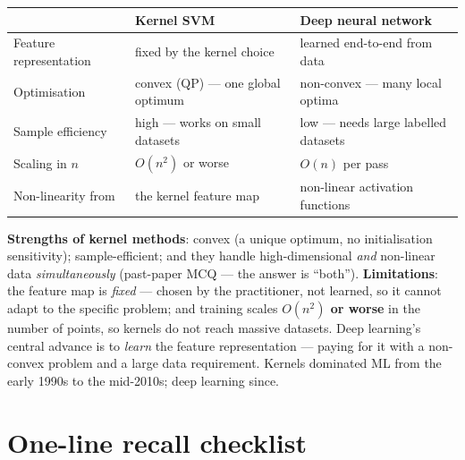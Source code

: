 \documentclass[11pt, a4paper]{article}
\newcommand{\thead}[1]{\textbf{#1}}
\newcommand{\kw}[1]{\textbf{#1}}
\begin{document}
\begin{center}
\renewcommand{\arraystretch}{1.2}
\begin{tabularx}{\linewidth}{l X X}
\toprule
& \thead{Kernel SVM} & \thead{Deep neural network} \\
\midrule
Feature representation & fixed by the kernel choice & learned end-to-end from data \\
Optimisation & convex (QP) — one global optimum & non-convex — many local optima \\
Sample efficiency & high — works on small datasets & low — needs large labelled datasets \\
Scaling in $n$ & $O(n^2)$ or worse & $O(n)$ per pass \\
Non-linearity from & the kernel feature map & non-linear activation functions \\
\bottomrule
\end{tabularx}
\end{center}

\kw{Strengths of kernel methods}: convex (a unique optimum, no initialisation sensitivity);
sample-efficient; and they handle high-dimensional \emph{and} non-linear data \emph{simultaneously}
(past-paper MCQ — the answer is ``both''). \kw{Limitations}: the feature map is \emph{fixed} — chosen
by the practitioner, not learned, so it cannot adapt to the specific problem; and training scales
\kw{$O(n^2)$ or worse} in the number of points, so kernels do not reach massive datasets. Deep
learning's central advance is to \emph{learn} the feature representation — paying for it with a
non-convex problem and a large data requirement. Kernels dominated ML from the early 1990s to the
mid-2010s; deep learning since.

\section*{One-line recall checklist}
\end{document}
